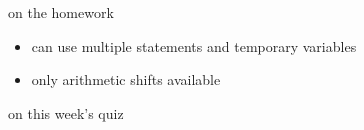 \begin{frame}{on the homework}
    \begin{itemize}
    \item can use multiple statements and temporary variables
    \item only arithmetic shifts available
    \end{itemize}
\end{frame}

\begin{frame}{on this week's quiz}
\end{frame}

\begin{frame}
\end{frame}



































